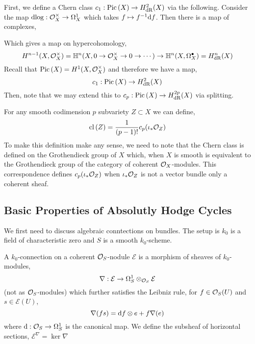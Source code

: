 \documentclass[12pt]{article}
\begin{document}
\begin{definition}
First, we define a Chern class $c_1 : \mathrm{Pic} \left( X \right) \to H^2_{\mathrm{dR}}(X)$ via the following. Consider the map $\mathrm{d}{\log} : \mathcal{O}_{X}^\times \to \Omega^1_X$ which takes $f \mapsto f^{-1} \mathrm{d}{f}$. Then there is a map of complexes,
\begin{center}
\end{center}
Which gives a map on hypercohomology,
\[ H^{n-1}(X, \mathcal{O}_{X}^\times) = \mathbb{H}^n(X, 0 \to \mathcal{O}_{X}^\times \to 0 \to \cdots) \to \mathbb{H}^n(X, \Omega^\bullet_X) = H^n_{\mathrm{dR}}(X) \]
Recall that $\mathrm{Pic} \left( X \right) = H^1(X, \mathcal{O}_{X}^\times)$ and therefore we have a map,
\[ c_1 : \mathrm{Pic} \left( X \right) \to H^2_{\mathrm{dR}}(X) \]
Then, note that we may extend this to $c_p : \mathrm{Pic} \left( X \right) \to H^{2p}_{\mathrm{dR}}(X)$ via splitting.
\end{definition}

\begin{definition}
For any smooth codimension $p$ subvariety $Z \subset X$ we can define,
\[ \mathrm{cl} \left( Z \right) = \frac{1}{(p - 1)!} c_p(\iota_* \mathcal{O}_{Z}) \]
To make this definition make any sense, we need to note that the Chern class is defined on the Grothendieck group of $X$ which, when $X$ is smooth is equivalent to the Grothendieck group of the category of coherent $\mathcal{O}_{X}$-modules. This correspondence defines $c_p(\iota_* \mathcal{O}_{Z})$ when $\iota_* \mathcal{O}_{Z}$ is not a vector bundle only a coherent sheaf. 
\end{definition}

\subsection{Basic Properties of Absolutly Hodge Cycles}

\begin{remark}
We first need to discuss algebraic conntections on bundles. The setup is $k_0$ is a field of characteristic zero and $S$ is a smooth $k_0$-scheme.  
\end{remark}

\begin{definition}
A $k_0$-connection on a coherent $\mathcal{O}_{S}$-nodule $\mathcal{E}$ is a morphism of sheaves of $k_0$-modules,
\[ \nabla : \mathcal{E} \to \Omega^1_{S} \otimes_{\mathcal{O}_{S}} \mathcal{E} \]
(not as $\mathcal{O}_{S}$-modules) which further satisfies the Leibniz rule, for $f \in \mathcal{O}_{S}(U)$ and $s \in \mathcal{E}(U)$,
\[ \nabla (f s) = \mathrm{d}{f} \otimes e + f \nabla (e) \]
where $\mathrm{d}{} : \mathcal{O}_{S} \to \Omega^1_S$ is the canonical map. We define the subsheaf of horizontal sections, $\mathcal{E}^\nabla = \ker{\nabla}$
\end{definition}
\end{document}
